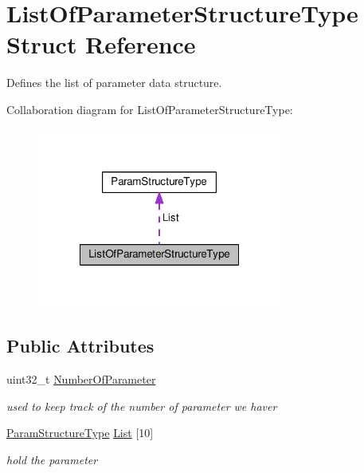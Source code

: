 \hypertarget{struct_list_of_parameter_structure_type}{\section{List\-Of\-Parameter\-Structure\-Type Struct Reference}
\label{struct_list_of_parameter_structure_type}
}


Defines the list of parameter data structure.  




Collaboration diagram for List\-Of\-Parameter\-Structure\-Type\-:\nopagebreak
\begin{figure}[H]
\begin{center}
\leavevmode
\includegraphics[width=228pt]{struct_list_of_parameter_structure_type__coll__graph}
\end{center}
\end{figure}
\subsection*{Public Attributes}
\begin{DoxyCompactItemize}
\item 
uint32\-\_\-t \hyperlink{struct_list_of_parameter_structure_type_a10041e965575f7a0a57158d2cc52b9e7}{Number\-Of\-Parameter}
\begin{DoxyCompactList}\small\item\em used to keep track of the number of parameter we haver \end{DoxyCompactList}\item 
\hyperlink{struct_param_structure_type}{Param\-Structure\-Type} \hyperlink{struct_list_of_parameter_structure_type_a9079f3b980c4a6f735367b19c375e6f9}{List} \mbox{[}10\mbox{]}
\begin{DoxyCompactList}\small\item\em hold the parameter \end{DoxyCompactList}\end{DoxyCompactItemize}


